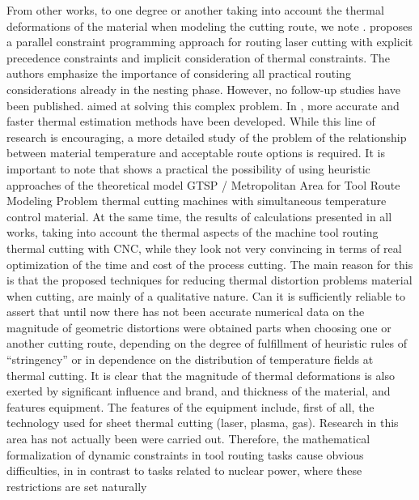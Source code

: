 \documentclass[10pt]{article}
\begin{document}
From other works, to one degree or another taking into account the thermal deformations of the material when modeling the cutting route, we note
\cite{bibx:113,bibx:115,bibx:302}.
\cite{bibx:113} proposes a parallel constraint programming approach
for routing laser cutting with explicit precedence constraints
and implicit consideration of thermal constraints. The authors emphasize the importance of considering all
practical routing considerations already in the nesting phase.
However, no follow-up studies have been published.
aimed at solving this complex problem.
In \cite{bibx:114}, more accurate and faster thermal estimation methods have been developed. While this line of research is encouraging,
a more detailed study of the problem of the relationship between material temperature and acceptable route options is required.
It is important to note that \cite{bibx:100, bibx:116} shows a practical
the possibility of using heuristic approaches of the theoretical model
GTSP / Metropolitan Area for Tool Route Modeling Problem
thermal cutting machines with simultaneous temperature control
material.
At the same time, the results of calculations presented in all works,
taking into account the thermal aspects of the machine tool routing
thermal cutting with CNC, while they look not very convincing
in terms of real optimization of the time and cost of the process
cutting. The main reason for this is that the proposed
techniques for reducing thermal distortion problems
material when cutting, are mainly of a qualitative nature. Can
it is sufficiently reliable to assert that until now there has not been
accurate numerical data on the magnitude of geometric distortions were obtained
parts when choosing one or another cutting route, depending on
the degree of fulfillment of heuristic rules of ``stringency'' or in
dependence on the distribution of temperature fields at thermal
cutting. It is clear that the magnitude of thermal deformations is also exerted by
significant influence and brand, and thickness of the material, and features
equipment. The features of the equipment include, first of all,
the technology used for sheet thermal cutting (laser,
plasma, gas). Research in this area has not actually been
were carried out.
Therefore, the mathematical formalization of dynamic constraints in
tool routing tasks cause obvious difficulties, in
in contrast to tasks related to nuclear power, where these
restrictions are set naturally \cite{1,3}
\end{document}
